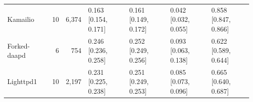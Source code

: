 \begin{table}[t]
\begin{tabularx}{\textwidth}{l r r *{4}{>{\centering\arraybackslash}X}}
Kamailio & 10 & 6,374 & \shortstack{0.163\\{[0.154, 0.171]}} & \shortstack{0.161\\{[0.149, 0.172]}} & \shortstack{0.042\\{[0.032, 0.055]}} & \shortstack{0.858\\{[0.847, 0.866]}} \\
Forked-daapd & 6 & 754 & \shortstack{0.246\\{[0.236, 0.258]}} & \shortstack{0.252\\{[0.249, 0.256]}} & \shortstack{0.093\\{[0.063, 0.138]}} & \shortstack{0.622\\{[0.589, 0.644]}} \\
Lighttpd1 & 10 & 2,197 & \shortstack{0.231\\{[0.225, 0.238]}} & \shortstack{0.251\\{[0.249, 0.253]}} & \shortstack{0.085\\{[0.073, 0.096]}} & \shortstack{0.665\\{[0.640, 0.687]}} \\
\bottomrule
\end{tabularx}
\end{table}
